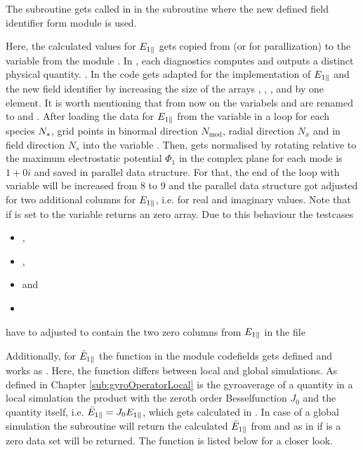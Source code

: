 The subroutine  gets called in  in the subroutine  where the new defined field identifier  form module  is used. 

Here, the calculated values for $E_{1\parallel}$ gets copied from  (or  for parallization) to the variable  from the module . In {\gkw}, each diagnostics computes and outputs a distinct physical quantity. \cite{GKWManual}. In  the code gets adapted for the implementation of $E_{1\parallel}$ and the new field identifier  by increasing the size of the arrays , , ,  and  by one element. It is worth mentioning that from now on the variabels  and  are renamed to  and . After loading the data for $E_{1\parallel}$ from the variable  in a loop for each species $N_s$, grid points in binormal direction $N_\mathrm{mod}$, radial direction $N_x$ and in field direction $N_s$ into the variable . Then,  gets normalised by rotating relative to the maximum electrostatic potential $\Phi_1$ in the complex plane for each mode is $1 + 0i$ and saved in parallel data structure. For that, the end of the loop with variable  will be increased from 8 to 9 and the parallel data structure got adjusted for two additional columns for $E_{1\parallel}$, i.e. for real and imaginary values. Note that if  is set to  the variable  returns an zero array. Due to this behaviour the testcases 
\begin{itemize}
    \item {},
    \item {},
    \item {} and
    \item {}
\end{itemize}
have to adjusted to contain the two zero columns from $E_{1\parallel}$ in the file 

Additionally, for $\bar{E}_{1\parallel}$ the function  in the module code{fields} gets defined and works as . Here, the function differs between local and global simulations. As defined in Chapter \ref{sub:gyroOperatorLocal} is the gyroaverage of a quantity in a local simulation the product with the zeroth order Besselfunction $J_0$ and the quantity itself, i.e. $\bar{E}_{1\parallel} = J_0 E_{1\parallel}$, which gets calculated in . In case of a global simulation the subroutine will return the calculated $\bar{E}_{1\parallel}$ from  and as in  if  is  a zero data set will be returned. The function  is listed below for a closer look.

